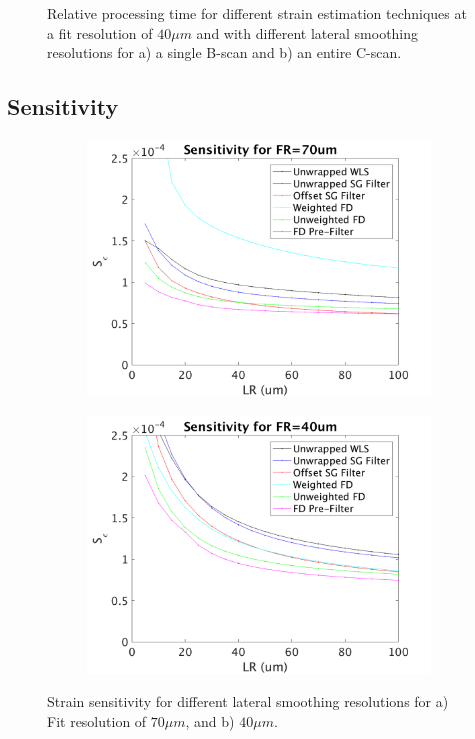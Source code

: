 \begin{figure}[th!]
\begin{subfigure}{0.49\textwidth}
    \end{subfigure}
    \caption{Relative processing time for different strain estimation techniques at a fit resolution of $40\mu m$ and with different lateral smoothing resolutions for a) a single B-scan and b) an entire C-scan.}
    \label{process_time_2}
\end{figure}

\subsection{Sensitivity}

\begin{figure}
	\centering
    \begin{subfigure}{0.49\textwidth}
    	\centering
        \includegraphics[width=\textwidth]{figures/sensitivity_FR70.png}
    \end{subfigure}
    \begin{subfigure}{0.49\textwidth}
    	\centering
        \includegraphics[width=\textwidth]{figures/sensitivity_FR40.png}
    \end{subfigure}
    \caption{Strain sensitivity for different lateral smoothing resolutions for a) Fit resolution of $70\mu m$, and b) $40\mu m$.}
    \label{sensitivity_2}	
\end{figure}


